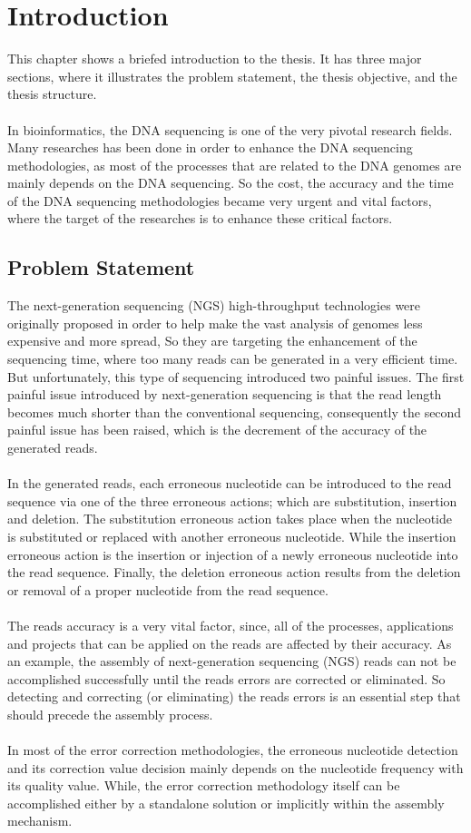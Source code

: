 \documentclass[12pt,openany]{llncs}
\begin{document}
\chapter{\label{chap:1} Introduction}
This chapter shows a briefed introduction to the thesis. It has three major sections, where it illustrates the problem statement, the thesis objective, and the thesis structure.
\\
\\
In bioinformatics, the DNA sequencing is one of the very pivotal research fields. Many researches has been done in order to enhance the DNA sequencing methodologies, as most of the processes that are related to the DNA genomes are mainly depends on the DNA sequencing. So the cost, the accuracy and the time of the DNA sequencing methodologies became very urgent and vital factors, where the target of the researches is to enhance these critical factors.
\section{Problem Statement}
The next-generation sequencing (NGS) high-throughput technologies \cite{NGS} were originally proposed in order to help make the vast analysis of genomes less expensive and more spread, So they are targeting the enhancement of the sequencing time, where too many reads can be generated in a very efficient time. But unfortunately, this type of sequencing introduced two painful issues. The first painful issue introduced by next-generation sequencing is that the read length becomes much shorter than the conventional sequencing, consequently the second painful issue has been raised, which is the decrement of the accuracy of the generated reads. 
\\
\\
In the generated reads, each erroneous nucleotide can be introduced to the read sequence via one of the three erroneous actions; which are substitution, insertion and deletion. 
The substitution erroneous action takes place when the nucleotide is substituted or replaced with another erroneous nucleotide. While the insertion erroneous action is the insertion or injection of a newly erroneous nucleotide into the read sequence. Finally, the deletion erroneous action results from the deletion or removal of a proper nucleotide from the read sequence.
\\
\\
The reads accuracy is a very vital factor, since, all of the processes, applications and projects that can be applied on the reads are affected by their accuracy. As an example, the assembly of next-generation sequencing (NGS) reads can not be accomplished successfully until the reads errors are corrected or eliminated. So detecting and correcting (or eliminating) the reads errors is an essential step that should precede the assembly process. 
\\
\\
In most of the error correction methodologies, the erroneous nucleotide detection and its correction value decision mainly depends on the nucleotide frequency with its quality value\cite{ErrCorr}. While, the error correction methodology itself can be accomplished either by a standalone solution or implicitly within the assembly mechanism. 
\end{document}
